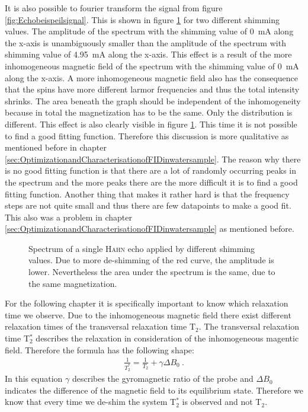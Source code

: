 It is also possible to fourier transform the signal from figure \ref{fig:Echobeispeilsignal}.
This is shown in figure \ref{fig:SpinEcho} for two different shimming values.
The amplitude of the spectrum with the shimming value of \SI{0}{\milli \ampere} along the x-axis is unambiguously smaller than the amplitude of the spectrum with shimming value of \SI{4.95}{\milli \ampere} along the x-axis.
This effect is a result of the more inhomogeneous magnetic field of the spectrum with the shimming value of \SI{0}{\milli \ampere} along the x-axis.
A more inhomogeneous magnetic field also has the consequence that the spins have more different larmor frequencies and thus the total intensity shrinks.
The area beneath the graph should be independent of the inhomogeneity because in total the magnetization has to be the same.
Only the distribution is different.
This effect is also clearly visible in figure \ref{fig:SpinEcho}.
This time it is not possible to find a good fitting function.
Therefore this discussion is more qualitative as mentioned before in chapter \ref{sec:OptimizationandCharacterisationofFIDinwatersample}.
The reason why there is no good fitting function is that there are a lot of randomly occurring peaks in the spectrum and the more peaks there are the more difficult it is to find a good fitting function.
Another thing that makes it rather hard is that the frequency steps are not quite small and thus there are few datapoints to make a good fit.
This also was a problem in chapter \ref{sec:OptimizationandCharacterisationofFIDinwatersample} as mentioned before.
\begin{figure}[H]
    \centering
    
    \caption[Spectrum of a single \textsc{Hahn} echo applied by different shimming values.]{Spectrum of a single \textsc{Hahn} echo applied by different shimming values.
    Due to more de-shimming of the red curve, the amplitude is lower.
    Nevertheless the area under the spectrum is the same, due to the same magnetization.}
    \label{fig:SpinEcho}
\end{figure}
For the following chapter it is specifically important to know which relaxation time we observe.
Due to the inhomogeneous magnetic field there exist different relaxation times of the transversal relaxation time T$_2$.
The transversal relaxation time T$_2^*$ describes the relaxation in consideration of the inhomogeneous magentic field.
Therefore the formula has the following shape:
\begin{align}
    \frac{1}{T_2^*} = \frac{1}{T_2} + \gamma \Delta B_0 \ .
    \label{eq:T2_star}
\end{align}
In this equation $\gamma$ describes the gyromagnetic ratio of the probe and $\Delta B_0$ indicates the difference of the magnetic field to its equilibrium state.
Therefore we know that every time we de-shim the system T$_2^*$ is observed and not T$_2$.